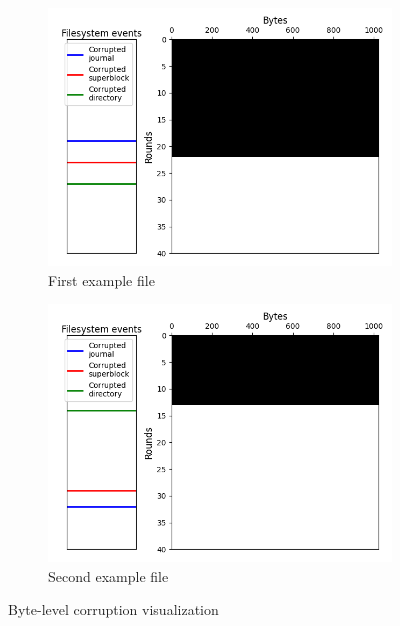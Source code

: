 \documentclass[a4paper,11pt,oneside]{report}
\begin{document}
\begin{figure}[ht]
     \centering
     \begin{subfigure}[b]{0.45\textwidth}
         \centering
         \includegraphics[width=\textwidth]{Figures/visual_file_corruption1.png}
         \caption{First example file}
         \label{fig:byte_file1}
     \end{subfigure}
     \hfill
     \begin{subfigure}[b]{0.45\textwidth}
         \centering
         \includegraphics[width=\textwidth]{Figures/visual_file_corruption2.png}
         \caption{Second example file}
         \label{fig:byte_file2}
     \end{subfigure}
        \caption{Byte-level corruption visualization}
        \label{fig:byte_visual}
\end{figure}
\end{document}
